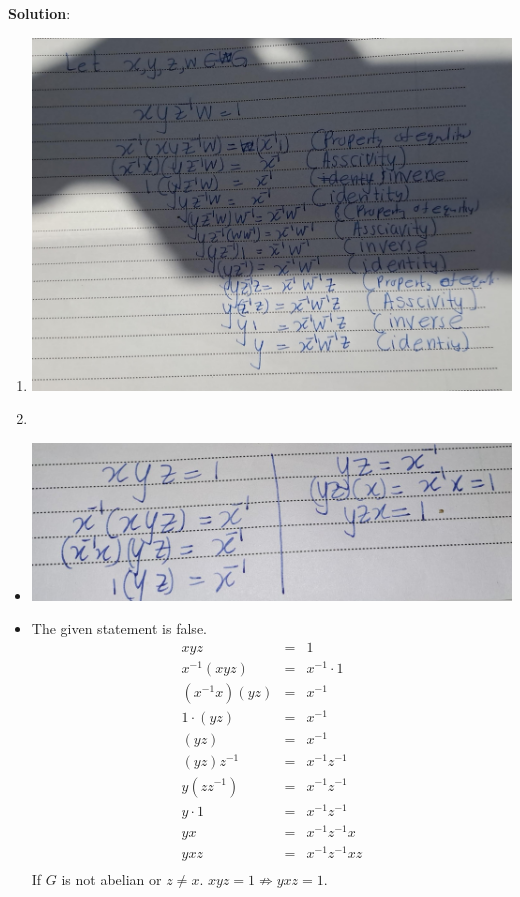 \documentclass[
]{book}
\providecommand{\tightlist}{%
  \setlength{\itemsep}{0pt}\setlength{\parskip}{0pt}}
\theoremstyle{definition}
\theoremstyle{definition}
\theoremstyle{definition}
\theoremstyle{definition}
\theoremstyle{remark}
\begin{document}
\textbf{Solution}:

\begin{enumerate}
\def\labelenumi{\alph{enumi}.}
\tightlist
\item
  \includegraphics{figures/ch_2/fig17.jpg}
\item
\end{enumerate}

\begin{itemize}
\tightlist
\item
  \hfill\break
  \includegraphics{figures/ch_2/fig18.jpg}
\item
  The given statement is false.
  \begin{eqnarray}
          xyz&=&1\\
  x^{-1}(xyz)&=&x^{-1} \cdot 1\\
  (x^{-1}x)(yz)&=&x^{-1}\\
  1 \cdot(yz)&=&x^{-1}\\
  (yz)&=&x^{-1}\\
  (yz)z^{-1}&=&x^{-1}z^{-1}\\
  y(zz^{-1})&=&x^{-1}z^{-1}\\
  y \cdot 1&=&x^{-1}z^{-1}\\
  yx&=&x^{-1}z^{-1}x\\
  yxz&=&x^{-1}z^{-1}xz\\
  \end{eqnarray}
  If \(G\) is not abelian or \(z\neq x\). \(xyz=1 \nRightarrow yxz=1\).
\end{itemize}
\end{document}
